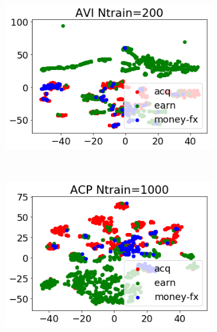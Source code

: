 \documentclass[twoside]{article}
\begin{document}
\begin{figure}
\begin{subfigure}[t]{0.33\textwidth}
        \label{fig: reuters_h50_avi_500}
    \end{subfigure}%
    ~
    \begin{subfigure}[t]{0.33\textwidth}
        \centering
        \includegraphics[width=1.0\linewidth]{reuters_avi200_h50.png}
        \label{fig: reuters_h50_avi_200}
    \end{subfigure}
    ~
    \begin{subfigure}[t]{0.33\textwidth}
        \centering
        \includegraphics[width=1.0\linewidth]{reuters_acp1000_h50.png}
        \label{fig: reuters_h50_acp_1000}
    \end{subfigure}%
    ~
    \begin{subfigure}[t]{0.33\textwidth}
        \centering

\end{subfigure}
\end{figure}
\end{document}
